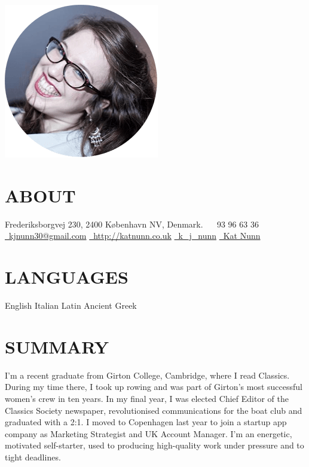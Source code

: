 \documentclass[]{friggeri-cv}
\begin{document}
       {}

\begin{aside}
  \includegraphics[width=.66\textwidth]{../img/profile.png}
  \section{ABOUT}
    Frederiksborgvej 230,
    2400 København NV,
    Denmark.
    ~
	\onehalfspacing
	\faPhone~93 96 63 36
	\href{mailto:kjnunn30@gmail.com}{\faEnvelope~kjnunn30@gmail.com}
	\href{http://katnunn.co.uk}{\faGlobe~http://katnunn.co.uk}
	\href{https://twitter.com/k\_j\_nunn}{\faTwitter~k\_j\_nunn}
	\href{http://uk.linkedin.com/in/katnunn/}{\faLinkedin~Kat Nunn}
	\singlespacing
  \section{LANGUAGES}
    English
    Italian
    Latin
    Ancient Greek
\end{aside}

\section{SUMMARY}
I’m a recent graduate from Girton College, Cambridge, where I read Classics. During my time there, I took up rowing and was part of Girton’s most successful women’s crew in ten years. In my final year, I was elected Chief Editor of the Classics Society newspaper, revolutionised communications for the boat club and graduated with a 2:1. I moved to Copenhagen last year to join a startup app company as Marketing Strategist and UK Account Manager. I’m an energetic, motivated self-starter, used to producing high-quality work under pressure and to tight deadlines.
\end{document}
